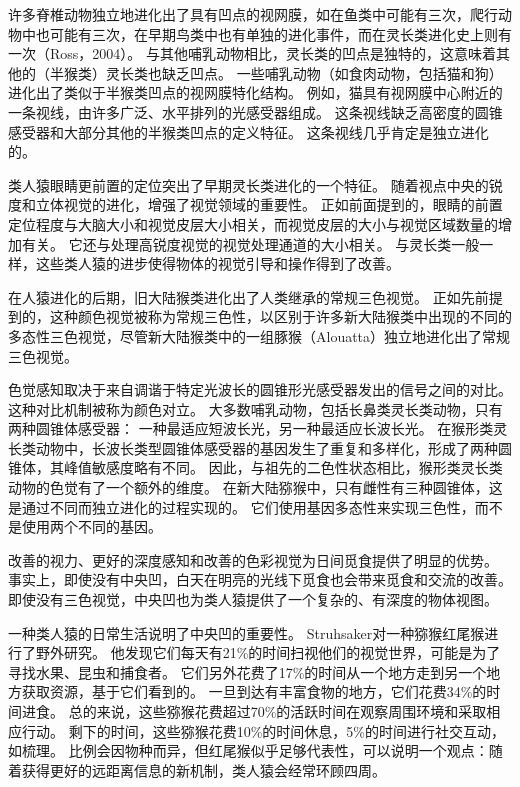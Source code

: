 许多脊椎动物独立地进化出了具有凹点的视网膜，如在鱼类中可能有三次，爬行动物中也可能有三次，在早期鸟类中也有单独的进化事件，而在灵长类进化史上则有一次（Ross，2004）。
与其他哺乳动物相比，灵长类的凹点是独特的，这意味着其他的（半猴类）灵长类也缺乏凹点。
一些哺乳动物（如食肉动物，包括猫和狗）进化出了类似于半猴类凹点的视网膜特化结构。
例如，猫具有视网膜中心附近的一条视线，由许多广泛、水平排列的光感受器组成。
这条视线缺乏高密度的圆锥感受器和大部分其他的半猴类凹点的定义特征\cite{crescitelli1977topography}。
这条视线几乎肯定是独立进化的。


类人猿眼睛更前置的定位突出了早期灵长类进化的一个特征。
随着视点中央的锐度和立体视觉的进化，增强了视觉领域的重要性。
正如前面提到的，眼睛的前置定位程度与大脑大小和视觉皮层大小相关\cite{barton1998visual}，而视觉皮层的大小与视觉区域数量的增加有关\cite{kaas2020evolution}。
它还与处理高锐度视觉的视觉处理通道的大小相关\cite{barton2004binocularity}。
与灵长类一般一样，这些类人猿的进步使得物体的视觉引导和操作得到了改善。


在人猿进化的后期，旧大陆猴类进化出了人类继承的常规三色视觉。
正如先前提到的，这种颜色视觉被称为常规三色性，以区别于许多新大陆猴类中出现的不同的多态性三色视觉，尽管新大陆猴类中的一组豚猴（Alouatta）独立地进化出了常规三色视觉。


色觉感知取决于来自调谐于特定光波长的圆锥形光感受器发出的信号之间的对比。
这种对比机制被称为颜色对立。
大多数哺乳动物，包括长鼻类灵长类动物，只有两种圆锥体感受器：
一种最适应短波长光，另一种最适应长波长光。
在猴形类灵长类动物中，长波长类型圆锥体感受器的基因发生了重复和多样化，形成了两种圆锥体，其峰值敏感度略有不同。
因此，与祖先的二色性状态相比，猴形类灵长类动物的色觉有了一个额外的维度。
在新大陆猕猴中，只有雌性有三种圆锥体，这是通过不同而独立进化的过程实现的。
它们使用基因多态性来实现三色性，而不是使用两个不同的基因。


改善的视力、更好的深度感知和改善的色彩视觉为日间觅食提供了明显的优势。
事实上，即使没有中央凹，白天在明亮的光线下觅食也会带来觅食和交流的改善。
即使没有三色视觉，中央凹也为类人猿提供了一个复杂的、有深度的物体视图。


一种类人猿的日常生活说明了中央凹的重要性。
Struhsaker\cite{struhsaker1980comparison}对一种猕猴红尾猴进行了野外研究。
他发现它们每天有21\%的时间扫视他们的视觉世界，可能是为了寻找水果、昆虫和捕食者。
它们另外花费了17\%的时间从一个地方走到另一个地方获取资源，基于它们看到的。
一旦到达有丰富食物的地方，它们花费34\%的时间进食。
总的来说，这些猕猴花费超过70\%的活跃时间在观察周围环境和采取相应行动。
剩下的时间，这些猕猴花费10\%的时间休息，5\%的时间进行社交互动，如梳理。
比例会因物种而异，但红尾猴似乎足够代表性，可以说明一个观点：随着获得更好的远距离信息的新机制，类人猿会经常环顾四周。


